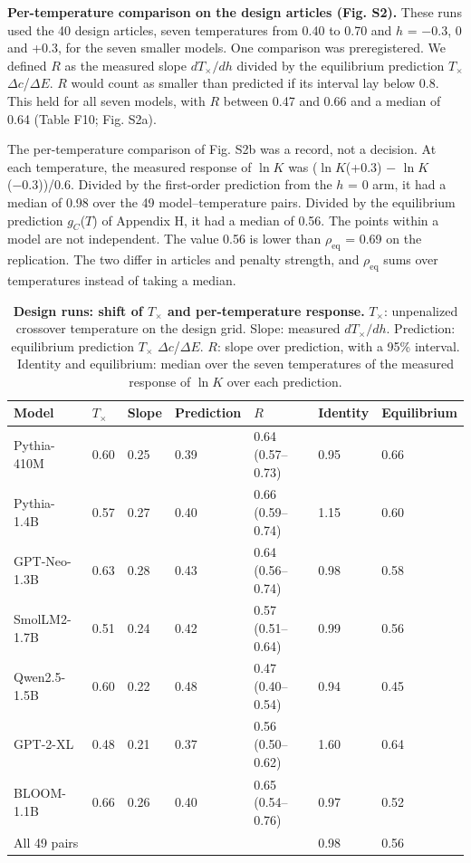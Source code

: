 \documentclass[aps,prx,onecolumn,superscriptaddress,longbibliography]{revtex4-2}
\begin{document}
\textbf{Per-temperature comparison on the design articles (Fig. S2).} These runs used the 40 design articles, seven temperatures from 0.40 to 0.70 and \(h\) = −0.3, 0 and +0.3, for the seven smaller models. One comparison was preregistered. We defined \(R\) as the measured slope \(dT_\times/dh\) divided by the equilibrium prediction \(T_{\times}\) \(\Delta c\)/\(\Delta E\). \(R\) would count as smaller than predicted if its interval lay below 0.8. This held for all seven models, with \(R\) between 0.47 and 0.66 and a median of 0.64 (Table F10; Fig. S2a).

The per-temperature comparison of Fig. S2b was a record, not a decision. At each temperature, the measured response of \(\ln K\) was (\(\ln K\)(+0.3) − \(\ln K\)(−0.3))/0.6. Divided by the first-order prediction from the \(h\) = 0 arm, it had a median of 0.98 over the 49 model--temperature pairs. Divided by the equilibrium prediction \(g_{C}\)(\(T\)) of Appendix H, it had a median of 0.56. The points within a model are not independent. The value 0.56 is lower than \(\rho_{\mathrm{eq}}\) = 0.69 on the replication. The two differ in articles and penalty strength, and \(\rho_{\mathrm{eq}}\) sums over temperatures instead of taking a median.

\begin{table}[htbp]
\centering
\small
\setlength{\tabcolsep}{6pt}
\renewcommand{\thetable}{F10}
\caption{\textbf{Design runs: shift of \(T_{\times}\) and per-temperature response.} \(T_{\times}\): unpenalized crossover temperature on the design grid. Slope: measured \(dT_\times/dh\). Prediction: equilibrium prediction \(T_{\times}\) \(\Delta c\)/\(\Delta E\). \(R\): slope over prediction, with a 95\% interval. Identity and equilibrium: median over the seven temperatures of the measured response of \(\ln K\) over each prediction.}
\label{tabF10}
\begin{tabular}{@{}lllllll@{}}
\toprule
Model & \(T_{\times}\) & Slope & Prediction & \(R\) & Identity & Equilibrium \\
\midrule
Pythia-410M & 0.60 & 0.25 & 0.39 & 0.64 (0.57--0.73) & 0.95 & 0.66 \\
Pythia-1.4B & 0.57 & 0.27 & 0.40 & 0.66 (0.59--0.74) & 1.15 & 0.60 \\
GPT-Neo-1.3B & 0.63 & 0.28 & 0.43 & 0.64 (0.56--0.74) & 0.98 & 0.58 \\
SmolLM2-1.7B & 0.51 & 0.24 & 0.42 & 0.57 (0.51--0.64) & 0.99 & 0.56 \\
Qwen2.5-1.5B & 0.60 & 0.22 & 0.48 & 0.47 (0.40--0.54) & 0.94 & 0.45 \\
GPT-2-XL & 0.48 & 0.21 & 0.37 & 0.56 (0.50--0.62) & 1.60 & 0.64 \\
BLOOM-1.1B & 0.66 & 0.26 & 0.40 & 0.65 (0.54--0.76) & 0.97 & 0.52 \\
All 49 pairs & & & & & 0.98 & 0.56 \\
\bottomrule
\end{tabular}
\end{table}
\end{document}
